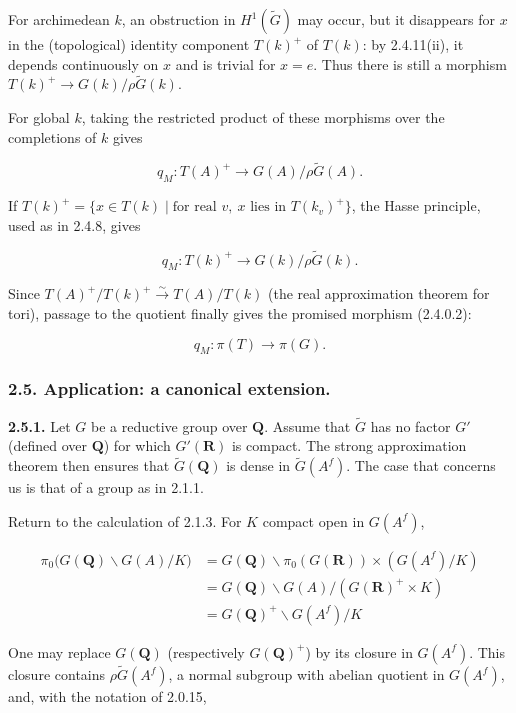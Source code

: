 \documentclass[10pt,a4paper]{article}
\begin{document}
For archimedean \(k\), an obstruction in \(H^1(\widetilde G)\) may occur, but it disappears for \(x\) in the (topological) identity component \(T(k)^+\) of \(T(k)\): by 2.4.11(ii), it depends continuously on \(x\) and is trivial for \(x=e\). Thus there is still a morphism \(T(k)^+\to G(k)/\rho\widetilde G(k)\).

For global \(k\), taking the restricted product of these morphisms over the completions of \(k\) gives

\[
q_M:T(A)^+\longrightarrow G(A)/\rho\widetilde G(A). \tag{2.4.12.1}
\]

If \(T(k)^+=\{x\in T(k)\mid\text{for real }v,\ x\text{ lies in }T(k_v)^+\}\), the Hasse principle, used as in 2.4.8, gives

\[
q_M:T(k)^+\longrightarrow G(k)/\rho\widetilde G(k). \tag{2.4.12.2}
\]

Since \(T(A)^+/T(k)^+\xrightarrow{\sim}T(A)/T(k)\) (the real approximation theorem for tori), passage to the quotient finally gives the promised morphism (2.4.0.2):

\[
q_M:\pi(T)\longrightarrow\pi(G).
\]

\subsubsection{2.5. Application: a canonical extension.}

\textbf{2.5.1.} Let \(G\) be a reductive group over \(\mathbf Q\). Assume that \(\widetilde G\) has no factor \(G'\) (defined over \(\mathbf Q\)) for which \(G'(\mathbf R)\) is compact. The strong approximation theorem then ensures that \(\widetilde G(\mathbf Q)\) is dense in \(\widetilde G(A^f)\). The case that concerns us is that of a group as in 2.1.1.

Return to the calculation of 2.1.3. For \(K\) compact open in \(G(A^f)\),

\[
\tag{2.5.1.1}
\begin{aligned}
\pi_0\bigl(G(\mathbf Q)\backslash G(A)/K\bigr)
&=G(\mathbf Q)\backslash\pi_0(G(\mathbf R))\times(G(A^f)/K)\\
&=G(\mathbf Q)\backslash G(A)/(G(\mathbf R)^+\times K)\\
&=G(\mathbf Q)^+\backslash G(A^f)/K
\end{aligned}
\]

One may replace \(G(\mathbf Q)\) (respectively \(G(\mathbf Q)^+\)) by its closure in \(G(A^f)\). This closure contains \(\rho\widetilde G(A^f)\), a normal subgroup with abelian quotient in \(G(A^f)\), and, with the notation of 2.0.15,
\end{document}
